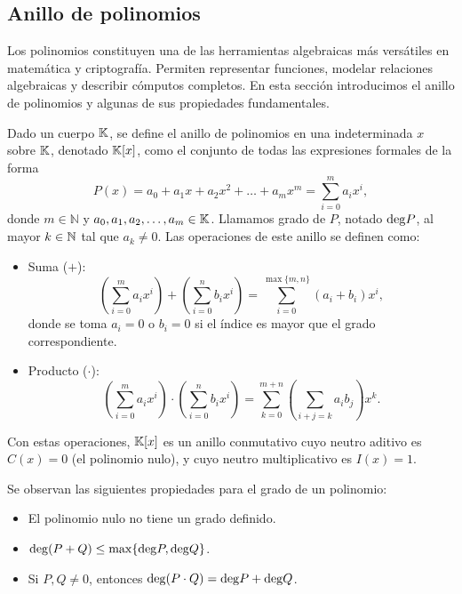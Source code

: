 
\subsection{Anillo de polinomios}
\label{subsec:apendice-a-polinomios-anillo-de-polinomios}

Los polinomios constituyen una de las herramientas algebraicas más versátiles en matemática y criptografía. Permiten representar funciones, modelar relaciones algebraicas y describir cómputos completos. En esta sección introducimos el anillo de polinomios y algunas de sus propiedades fundamentales.

\begin{definition}
\label{def:apendice-a-polinomios-anillo-de-polinomios}
	Dado un cuerpo $\mathbb{K}$, se define el anillo de polinomios en una indeterminada $x$ sobre $\mathbb{K}$, denotado $\mathbb{K}[x]$, como el conjunto de todas las expresiones formales de la forma
	$$P(x) = a_0 + a_1x + a_2x^2 + \ldots + a_mx^m = \sum_{i=0}^{m} a_i x^i,$$
	donde $m \in \mathbb{N}$ y $a_0, a_1, a_2, \ldots, a_m \in \mathbb{K}$. Llamamos grado de $P$, notado $\mathrm{deg} P$, al mayor $k \in \mathbb{N}$ tal que $a_k \neq 0$. Las operaciones de este anillo se definen como:
	\begin{itemize}
		\item Suma ($+$): $$\left(\sum_{i=0}^{m} a_i x^i\right) + \left(\sum_{i=0}^{n} b_i x^i\right) = \sum_{i=0}^{\max\{m,n\}} (a_i + b_i) x^i,$$
		donde se toma $a_i = 0$ o $b_i = 0$ si el índice es mayor que el grado correspondiente.
		\item Producto ($\cdot$): $$\left(\sum_{i=0}^{m} a_i x^i\right) \cdot \left(\sum_{i=0}^{n} b_i x^i\right) = \sum_{k=0}^{m+n}\left(\sum_{i+j=k}a_ib_j\right)x^k.$$
	\end{itemize}
	
	Con estas operaciones, $\mathbb{K}[x]$ es un anillo conmutativo cuyo neutro aditivo es $C(x) = 0$ (el polinomio nulo), y cuyo neutro multiplicativo es $I(x) = 1$.
\end{definition}

Se observan las siguientes propiedades para el grado de un polinomio:

\begin{itemize}
	\item El polinomio nulo no tiene un grado definido.
	\item $\mathrm{deg}(P + Q) \leq \max\{\mathrm{deg} P, \mathrm{deg} Q\}$.
	\item Si $P, Q \neq 0$, entonces $\mathrm{deg}(P \cdot Q) = \mathrm{deg} P + \mathrm{deg} Q$.
\end{itemize}

